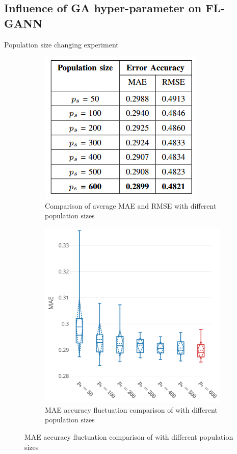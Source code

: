\documentclass{beamer}
\newcommand{\notesize}{\fontsize{8}{10}\selectfont}
\begin{document}
\subsection{Influence of GA hyper-parameter on FL-GANN}
\begin{frame}{Population size changing experiment}
	\begin{figure}
		\centering
		\begin{subfigure}{0.4\textwidth}
			\centering
			\includegraphics[width=1.0\linewidth]{ps_changing.png}
			\caption*{\notesize Comparison of average MAE and RMSE with different population sizes}
			\label{fig:sub11}
		\end{subfigure}%
		\begin{subfigure}{.6\textwidth}
			\centering
			\includegraphics[width=0.8\linewidth]{tn2_multi_cpu_best_ps.pdf}
			\caption*{ \notesize MAE accuracy fluctuation comparison of with different population sizes}
			\label{fig:sub21}
		\end{subfigure}%
		\label{fig:cpu_predict}
	\end{figure}
\end{frame}
\end{document}
